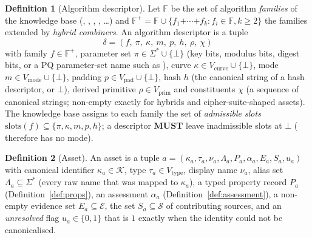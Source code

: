 \documentclass[11pt,a4paper]{article}
\newcommand{\MUST}{\textbf{MUST}}
\newcommand{\Ids}{\mathcal{K}}
\newcommand{\Evs}{\mathcal{E}}
\newcommand{\Srcs}{\mathcal{S}}
\theoremstyle{definition}
\newtheorem{definition}{Definition}[section]
\theoremstyle{plain}
\begin{document}
\begin{definition}[Algorithm descriptor]\label{def:descriptor}
Let $\mathbb{F}$ be the set of algorithm \emph{families} of the knowledge base
(, , , , \ldots) and
$\mathbb{F}^{+} = \mathbb{F} \cup \{f_1\text{+}\cdots\text{+}f_k : f_i \in \mathbb{F}, k\ge 2\}$
the families extended by \emph{hybrid combiners}. An algorithm descriptor is a tuple
$$\delta = (f,\ \pi,\ \kappa,\ m,\ p,\ h,\ \rho,\ \chi)$$
with family $f \in \mathbb{F}^{+}$, parameter set $\pi \in \Sigma^{*}\cup\{\bot\}$ (key bits,
modulus bits, digest bits, or a PQ parameter-set name such as ), curve
$\kappa \in V_{\mathrm{curve}}\cup\{\bot\}$, mode $m \in V_{\mathrm{mode}}\cup\{\bot\}$, padding
$p \in V_{\mathrm{pad}}\cup\{\bot\}$, hash $h$ (the canonical string of a hash descriptor, or
$\bot$), derived primitive $\rho \in V_{\mathrm{prim}}$ and constituents $\chi$ (a sequence of
canonical strings; non-empty exactly for hybrids and cipher-suite-shaped assets). The knowledge
base assigns to each family the set of \emph{admissible slots}
$\mathrm{slots}(f) \subseteq \{\pi,\kappa,m,p,h\}$; a descriptor \MUST{} leave inadmissible
slots at $\bot$ ( therefore has no mode).
\end{definition}

\begin{definition}[Asset]\label{def:asset}
An asset is a tuple $a = (\kappa_a, \tau_a, \nu_a, \Lambda_a, P_a, \alpha_a, E_a, S_a, u_a)$ with
canonical identifier $\kappa_a \in \Ids$, type $\tau_a \in V_{\mathrm{type}}$, display name
$\nu_a$, alias set $\Lambda_a \subseteq \Sigma^{*}$ (every raw name that was mapped to $\kappa_a$),
a typed property record $P_a$ (Definition~\ref{def:props}), an assessment $\alpha_a$
(Definition~\ref{def:assessment}), a non-empty evidence set $E_a \subseteq \Evs$, the set
$S_a \subseteq \Srcs$ of contributing sources, and an \emph{unresolved} flag $u_a \in \{0,1\}$
that is $1$ exactly when the identity could not be canonicalised.
\end{definition}
\end{document}
